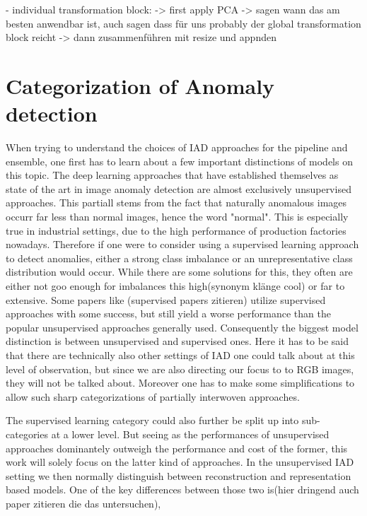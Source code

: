 - individual transformation block:
-> first apply PCA
-> sagen wann das am besten anwendbar ist, auch sagen dass für uns probably der global transformation block reicht
-> dann zusammenführen mit resize und appnden



\section{Categorization of Anomaly detection}
\label{sec:IADcategs}
When trying to understand the choices of IAD approaches for the pipeline and ensemble, one first has to learn about a few important distinctions of models on this topic.
The deep learning approaches that have established themselves as state of the art in image anomaly detection are almost exclusively unsupervised approaches. This partiall stems from the fact 
that naturally anomalous images occurr far less than normal images, hence the word "normal". This is especially true in industrial settings, due to the high performance of production factories 
nowadays. Therefore if one were to consider using a supervised learning approach to detect anomalies, either a strong class imbalance or an unrepresentative class distribution would occur.
While there are some solutions for this, they often are either not goo enough for imbalances this high(synonym klänge cool) or far to extensive. Some papers like (supervised papers zitieren)
utilize supervised approaches with some success, but still yield a worse performance than the popular unsupervised approaches generally used. Consequently the biggest model distinction is 
between unsupervised and supervised ones. Here it has to be said that there are technically also other settings of IAD one could talk about at this level of observation, but since we are also 
directing our focus to to RGB images, they will not be talked about. Moreover one has to make some simplifications to allow such sharp categorizations of partially interwoven approaches.

The supervised learning category could also further be split up into sub-categories at a lower level. But seeing as the performances of unsupervised approaches dominantely outweigh the 
performance and cost of the former, this work will solely focus on the latter kind of approaches. In the unsupervised IAD setting we then normally distinguish between reconstruction and 
representation based models. One of the key differences between those two is(hier dringend auch paper zitieren die das untersuchen), 


